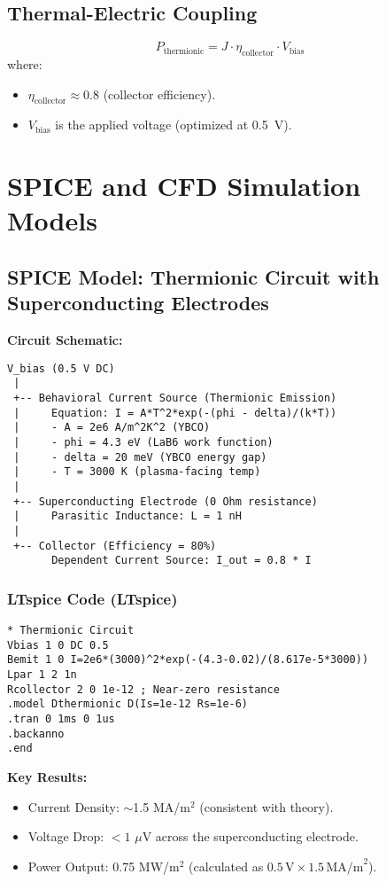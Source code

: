 \documentclass[12pt]{article}
\begin{document}
\subsection{Thermal-Electric Coupling}
\begin{equation}
    P_{\text{thermionic}} = J \cdot \eta_{\text{collector}} \cdot V_{\text{bias}}
\end{equation}
where:
\begin{itemize}
    \item $\eta_{\text{collector}} \approx 0.8$ (collector efficiency).
    \item $V_{\text{bias}}$ is the applied voltage (optimized at 0.5~V).
\end{itemize}

\section{SPICE and CFD Simulation Models}
\subsection{SPICE Model: Thermionic Circuit with Superconducting Electrodes}
\textbf{Circuit Schematic:}

\begin{lstlisting}[basicstyle=\ttfamily\footnotesize]
V_bias (0.5 V DC)
 |
 +-- Behavioral Current Source (Thermionic Emission)
 |     Equation: I = A*T^2*exp(-(phi - delta)/(k*T))
 |     - A = 2e6 A/m^2K^2 (YBCO)
 |     - phi = 4.3 eV (LaB6 work function)
 |     - delta = 20 meV (YBCO energy gap)
 |     - T = 3000 K (plasma-facing temp)
 |
 +-- Superconducting Electrode (0 Ohm resistance)
 |     Parasitic Inductance: L = 1 nH
 |
 +-- Collector (Efficiency = 80%)
       Dependent Current Source: I_out = 0.8 * I
\end{lstlisting}

\subsubsection*{LTspice Code (LTspice)}
\begin{lstlisting}[language=spice,caption=LTspice Thermionic Circuit]
* Thermionic Circuit
Vbias 1 0 DC 0.5
Bemit 1 0 I=2e6*(3000)^2*exp(-(4.3-0.02)/(8.617e-5*3000))
Lpar 1 2 1n
Rcollector 2 0 1e-12 ; Near-zero resistance
.model Dthermionic D(Is=1e-12 Rs=1e-6)
.tran 0 1ms 0 1us
.backanno
.end
\end{lstlisting}

\textbf{Key Results:}
\begin{itemize}
    \item Current Density: $\sim$1.5 MA/m$^2$ (consistent with theory).
    \item Voltage Drop: $<1$ $\mu$V across the superconducting electrode.
    \item Power Output: 0.75 MW/m$^2$ (calculated as $0.5\,\text{V} \times 1.5\,\text{MA/m}^2$).
\end{itemize}
\end{document}
